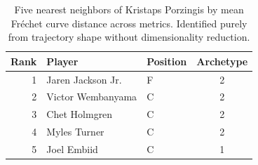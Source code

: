 \begin{table}[htbp]
  \centering\small
  \begin{tabular}{rllc}
    \toprule
    Rank & Player & Position & Archetype \\
    \midrule
    1 & Jaren Jackson Jr. & F & 2 \\
    2 & Victor Wembanyama & C & 2 \\
    3 & Chet Holmgren & C & 2 \\
    4 & Myles Turner & C & 2 \\
    5 & Joel Embiid & C & 1 \\
    \bottomrule
  \end{tabular}
  \caption{Five nearest neighbors of Kristaps Porzingis by mean Fr\'{e}chet curve distance across metrics. Identified purely from trajectory shape without dimensionality reduction.}
  \label{tab:Kristaps_Porzingis_frechet_curve_neighbors}
\end{table}

